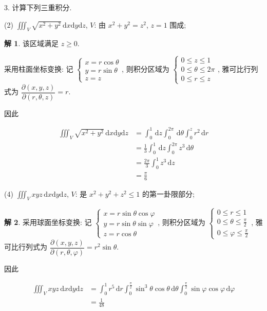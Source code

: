 \documentclass[a4paper,12pt]{article}
\theoremstyle{definition}
\newtheorem*{sol}{解}
\begin{document}
3. 计算下列三重积分.

(2) $\displaystyle\iiint_V \sqrt{x^2+y^2} \, \mathrm{d}x\mathrm{d}y\mathrm{d}z$, $V$: 由 $x^2+y^2=z^2$, $z=1$ 围成;
\begin{sol}
    该区域满足 $z\geq0$.

    采用柱面坐标变换: 记 $\begin{cases}
            x=r\cos\theta \\
            y=r\sin\theta \\
            z=z
        \end{cases}$, 则积分区域为 $\begin{cases}
            0\leq z\leq 1         \\
            0\leq \theta\leq 2\pi \\
            0\leq r\leq z
        \end{cases}$, 雅可比行列式为 $\dfrac{\partial(x,y,z)}{\partial(r,\theta,z)}=r$.

    因此

    \begin{align*}
        \iiint_V \sqrt{x^2+y^2} \, \mathrm{d}x\mathrm{d}y\mathrm{d}z
         & =\int_0^1\,\mathrm{d}z\int_0^{2\pi}\,\mathrm{d}\theta\int_0^zr^2\,\mathrm{d}r \\
         & =\frac{1}{3}\int_0^1\,\mathrm{d}z\int_0^{2\pi}z^3\,\mathrm{d}\theta           \\
         & =\frac{2\pi}{3}\int_0^1z^3\,\mathrm{d}z                                       \\
         & =\frac{\pi}{6}
    \end{align*}
\end{sol}
(4) $\displaystyle\iiint_V xyz \, \mathrm{d}x\mathrm{d}y\mathrm{d}z$, $V$: 是 $x^2+y^2+z^2 \leq 1$ 的第一卦限部分;
\begin{sol}
    采用球面坐标变换: 记 $\begin{cases}
            x=r\sin\theta\cos\varphi \\
            y=r\sin\theta\sin\varphi \\
            z=r\cos\theta
        \end{cases}$, 则积分区域为 $\begin{cases}
            0\leq r\leq 1                  \\
            0\leq \theta\leq \frac{\pi}{2} \\
            0\leq \varphi\leq \frac{\pi}{2}
        \end{cases}$, 雅可比行列式为 $\dfrac{\partial(x,y,z)}{\partial(r,\theta,\varphi)}=r^2\sin\theta$.

    因此

    \begin{align*}
        \iiint_V xyz \, \mathrm{d}x\mathrm{d}y\mathrm{d}z
         & =\int_0^1 r^5\,\mathrm{d}r\int_0^{\frac{\pi}{2}}\sin^3\theta\cos\theta\,\mathrm{d}\theta\int_0^{\frac{\pi}{2}}\sin\varphi\cos\varphi\,\mathrm{d}\varphi \\
         & =\frac{1}{48}
    \end{align*}
\end{sol}
\end{document}
